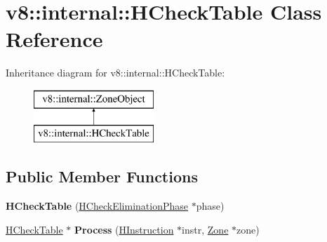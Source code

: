 \hypertarget{classv8_1_1internal_1_1_h_check_table}{}\section{v8\+:\+:internal\+:\+:H\+Check\+Table Class Reference}
\label{classv8_1_1internal_1_1_h_check_table}
Inheritance diagram for v8\+:\+:internal\+:\+:H\+Check\+Table\+:\begin{figure}[H]
\begin{center}
\leavevmode
\includegraphics[height=2.000000cm]{classv8_1_1internal_1_1_h_check_table}
\end{center}
\end{figure}
\subsection*{Public Member Functions}
\begin{DoxyCompactItemize}
\item 
\hypertarget{classv8_1_1internal_1_1_h_check_table_af9ddda8eac24c84d8b5cb41241868469}{}{\bfseries H\+Check\+Table} (\hyperlink{classv8_1_1internal_1_1_h_check_elimination_phase}{H\+Check\+Elimination\+Phase} $\ast$phase)\label{classv8_1_1internal_1_1_h_check_table_af9ddda8eac24c84d8b5cb41241868469}

\item 
\hypertarget{classv8_1_1internal_1_1_h_check_table_a3947bbc03f0e5b37b2dd54fc1064d95a}{}\hyperlink{classv8_1_1internal_1_1_h_check_table}{H\+Check\+Table} $\ast$ {\bfseries Process} (\hyperlink{classv8_1_1internal_1_1_h_instruction}{H\+Instruction} $\ast$instr, \hyperlink{classv8_1_1internal_1_1_zone}{Zone} $\ast$zone)\label{classv8_1_1internal_1_1_h_check_table_a3947bbc03f0e5b37b2dd54fc1064d95a}

\end{DoxyCompactItemize}
